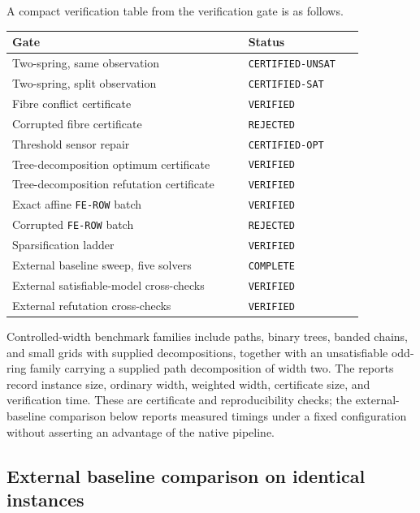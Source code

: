 \documentclass[11pt]{article}
\theoremstyle{plain}
\theoremstyle{definition}
\theoremstyle{remark}
\begin{document}
A compact verification table from the verification gate is as follows.
\begin{center}
\begin{tabular}{@{}p{0.58\linewidth}p{0.28\linewidth}@{}}
\toprule
Gate & Status\\
\midrule
Two-spring, same observation & \texttt{CERTIFIED-UNSAT}\\
Two-spring, split observation & \texttt{CERTIFIED-SAT}\\
Fibre conflict certificate & \texttt{VERIFIED}\\
Corrupted fibre certificate & \texttt{REJECTED}\\
Threshold sensor repair & \texttt{CERTIFIED-OPT}\\
Tree-decomposition optimum certificate & \texttt{VERIFIED}\\
Tree-decomposition refutation certificate & \texttt{VERIFIED}\\
Exact affine \texttt{FE-ROW} batch & \texttt{VERIFIED}\\
Corrupted \texttt{FE-ROW} batch & \texttt{REJECTED}\\
Sparsification ladder & \texttt{VERIFIED}\\
External baseline sweep, five solvers & \texttt{COMPLETE}\\
External satisfiable-model cross-checks & \texttt{VERIFIED}\\
External refutation cross-checks & \texttt{VERIFIED}\\
\bottomrule
\end{tabular}
\end{center}

Controlled-width benchmark families include paths, binary trees,
banded chains, and small grids with supplied decompositions, together with an
unsatisfiable odd-ring family carrying a supplied path decomposition of width
two.  The reports record instance size, ordinary width, weighted width,
certificate size, and verification time.  These are certificate and
reproducibility checks; the external-baseline comparison below reports measured
timings under a fixed configuration without asserting an advantage of the
native pipeline.

\subsection{External baseline comparison on identical instances}
\label{subsec:external-baselines}
\end{document}
